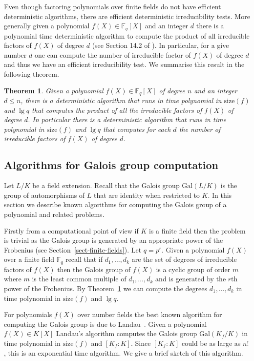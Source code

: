 \documentclass[11pt]{madras}%
\newtheorem{theorem}{Theorem}[chapter]
\theoremstyle{remark}
\newcommand{\Gal}[1]{{\ensuremath{\mathrm{Gal}\left(#1\right)}}}
\newcommand{\size}[1]{{\ensuremath{\mathrm{size}\left(#1\right)}}}
\begin{document}
Even though factoring polynomials over finite fields do not have
efficient deterministic algorithms, there are efficient deterministic
irreducibility tests. More generally given a polynomial $f(X) \in
\mathbb{F}_q[X]$ and an integer $d$ there is a polynomial time
deterministic algorithm to compute the product of all irreducible
factors of $f(X)$ of degree $d$ (see Section 14.2 of
\cite{gathen:modern}). In particular, for a give number $d$ one can
compute the number of irreducible factor of $f(X)$ of degree $d$ and
thus we have an efficient irreducibility test.  We summarise this
result in the following theorem.

\begin{theorem}\label{thm-degree-sequence}%
  Given a polynomial $f(X) \in \mathbb{F}_q[X]$ of degree $n$ and an
  integer $d \leq n$, there is a deterministic algorithm that runs in
  time polynomial in $\size{f}$ and $\lg{q}$ that computes the product
  of all the irreducible factors of $f(X)$ of degree $d$. In
  particular there is a deterministic algorithm that runs in time
  polynomial in $\size{f}$ and $\lg{q}$ that computes for each $d$ the
  number of irreducible factors of $f(X)$ of degree $d$.
\end{theorem}

\subsection{Algorithms for Galois group computation}

Let $L/K$ be a field extension. Recall that the Galois group
$\Gal{L/K}$ is the group of automorphisms of $L$ that are identity
when restricted to $K$. In this section we describe known algorithms
for computing the Galois group of a polynomial and related problems.

Firstly from a computational point of view if $K$ is a finite field
then the problem is trivial as the Galois group is generated by an
appropriate power of the Frobenius (see
Section~\ref{sect-finite-fields}). Let $q = p^r$. Given a polynomial
$f(X)$ over a finite field $\mathbb{F}_q$ recall that if
$d_1,\ldots,d_k$ are the set of degrees of irreducible factors of
$f(X)$ then the Galois group of $f(X)$ is a cyclic group of order $m$
where $m$ is the least common multiple of $d_1,\ldots,d_k$ and is
generated by the $r$th power of the Frobenius. By
Theorem~\ref{thm-degree-sequence} we can compute the degrees
$d_1,\ldots,d_k$ in time polynomial in $\size{f}$ and $\lg{q}$.

For polynomials $f(X)$ over number fields the best known algorithm for
computing the Galois group is due to Landau~\cite{landau84galois}.
Given a polynomial $f(X) \in K[X]$ Landau's algorithm computes the
Galois group $\Gal{K_f/K}$ in time polynomial in $\size{f}$ and $[K_f:
K]$. Since $[K_f:K]$ could be as large as $n!$, this is an exponential
time algorithm. We give a brief sketch of this algorithm.
\end{document}
